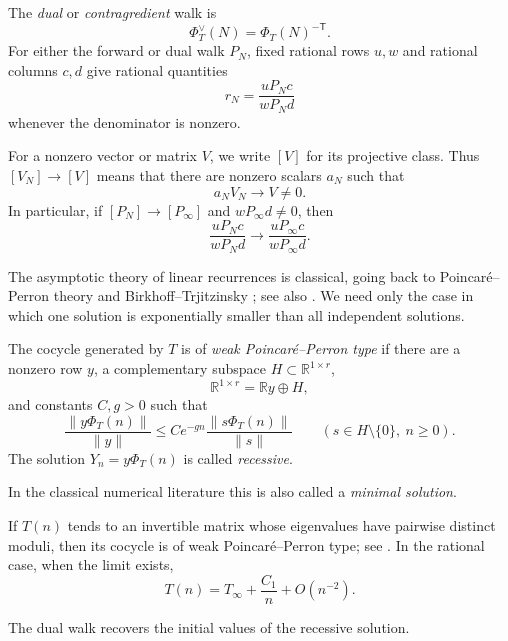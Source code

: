 \documentclass[oneside,english,11pt]{amsart}
\begin{document}
The \emph{dual} or \emph{contragredient} walk is
\[
    \Phi_T^\vee(N)=\Phi_T(N)^{-\mathsf T}.
\]
For either the forward or dual walk $P_N$, fixed rational rows $u,w$
and rational columns $c,d$ give rational quantities
\[
    r_N=\frac{uP_Nc}{wP_Nd}
\]
whenever the denominator is nonzero.

For a nonzero vector or matrix $V$, we write $[V]$ for its projective
class.  Thus $[V_N]\to[V]$ means that there are nonzero scalars $a_N$
such that
\[
    a_NV_N\longrightarrow V\ne0.
\]
In particular, if $[P_N]\to[P_\infty]$ and $wP_\infty d\ne0$, then
\[
    \frac{uP_Nc}{wP_Nd}
    \longrightarrow
    \frac{uP_\infty c}{wP_\infty d}.
\]

The asymptotic theory of linear recurrences is classical, going back to
Poincar\'e--Perron theory and Birkhoff--Trjitzinsky
\cite{birkhoff1930formal,birkhoff1933analytic}; see also
\cite{wimp1985resurrecting}.  We need only the case in which one
solution is exponentially smaller than all independent solutions.

\begin{defn}
\label{def:weak-pp}
The cocycle generated by $T$ is of \emph{weak Poincar\'e--Perron type}
if there are a nonzero row $y$, a complementary subspace
$H\subset\mathbb R^{1\times r}$,
\[
    \mathbb R^{1\times r}=\mathbb Ry\oplus H,
\]
and constants $C,g>0$ such that
\[
    \frac{\|y\Phi_T(n)\|}{\|y\|}
    \le
    Ce^{-gn}\frac{\|s\Phi_T(n)\|}{\|s\|}
    \qquad
    (s\in H\setminus\{0\},\ n\ge0).
\]
The solution $Y_n=y\Phi_T(n)$ is called \emph{recessive}.
\end{defn}

In the classical numerical literature this is also called a
\emph{minimal solution}.

\begin{remark}
\label{rem:separated-spectrum}
If $T(n)$ tends to an invertible matrix whose eigenvalues have pairwise
distinct moduli, then its cocycle is of weak Poincar\'e--Perron type;
see \cite[Lemma~4.3]{weinbaum2025conservative}.  In the rational case,
when the limit exists,
\[
    T(n)=T_\infty+\frac{C_1}{n}+O(n^{-2}).
\]
\end{remark}

The dual walk recovers the initial values of the recessive solution.
\end{document}
